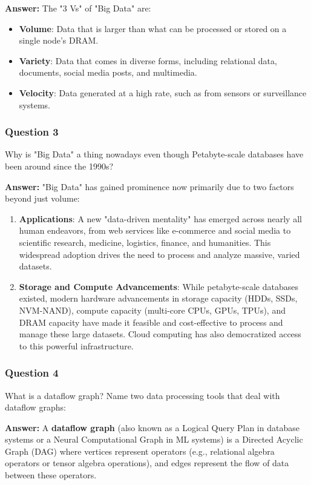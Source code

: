 \documentclass{article}
\begin{document}
\textbf{Answer:}
The "3 Vs" of "Big Data" are:
\begin{itemize}
    \item \textbf{Volume}: Data that is larger than what can be processed or stored on a single node's DRAM.
    \item \textbf{Variety}: Data that comes in diverse forms, including relational data, documents, social media posts, and multimedia.
    \item \textbf{Velocity}: Data generated at a high rate, such as from sensors or surveillance systems.
\end{itemize}

\subsubsection*{Question 3}
Why is "Big Data" a thing nowadays even though Petabyte-scale databases have been around since the 1990s? 

\textbf{Answer:}
"Big Data" has gained prominence now primarily due to two factors beyond just volume:
\begin{enumerate}
    \item \textbf{Applications}: A new "data-driven mentality" has emerged across nearly all human endeavors, from web services like e-commerce and social media to scientific research, medicine, logistics, finance, and humanities. This widespread adoption drives the need to process and analyze massive, varied datasets.
    \item \textbf{Storage and Compute Advancements}: While petabyte-scale databases existed, modern hardware advancements in storage capacity (HDDs, SSDs, NVM-NAND), compute capacity (multi-core CPUs, GPUs, TPUs), and DRAM capacity have made it feasible and cost-effective to process and manage these large datasets. Cloud computing has also democratized access to this powerful infrastructure.
\end{enumerate}

\subsubsection*{Question 4}
What is a dataflow graph? Name two data processing tools that deal with dataflow graphs: 

\textbf{Answer:}
A \textbf{dataflow graph} (also known as a Logical Query Plan in database systems or a Neural Computational Graph in ML systems) is a Directed Acyclic Graph (DAG) where vertices represent operators (e.g., relational algebra operators or tensor algebra operations), and edges represent the flow of data between these operators.
\end{document}
